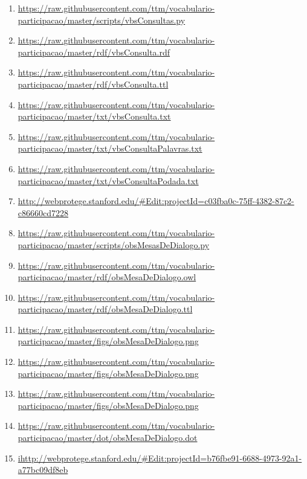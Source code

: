 \documentclass[12pt]{article}
\begin{document}
{\begin{enumerate}
\item \url{https://raw.githubusercontent.com/ttm/vocabulario-participacao/master/scripts/vbsConsultas.py}        \label{i:51}
    \item \url{https://raw.githubusercontent.com/ttm/vocabulario-participacao/master/rdf/vbsConsulta.rdf}        \label{i:52}
    \item \url{https://raw.githubusercontent.com/ttm/vocabulario-participacao/master/rdf/vbsConsulta.ttl}        \label{i:53}
    \item \url{https://raw.githubusercontent.com/ttm/vocabulario-participacao/master/txt/vbsConsulta.txt}        \label{i:54}
    \item \url{https://raw.githubusercontent.com/ttm/vocabulario-participacao/master/txt/vbsConsultaPalavras.txt}\label{i:55}
    \item \url{https://raw.githubusercontent.com/ttm/vocabulario-participacao/master/txt/vbsConsultaPodada.txt}  \label{i:56}
    \item \url{http://webprotege.stanford.edu/#Edit:projectId=c03fba0c-75ff-4382-87c2-c86660cd7228}  \label{i:56wp}

 \item \url{https://raw.githubusercontent.com/ttm/vocabulario-participacao/master/scripts/obsMesasDeDialogo.py}\label{i:57}
    \item  \url{https://raw.githubusercontent.com/ttm/vocabulario-participacao/master/rdf/obsMesaDeDialogo.owl}\label{i:58}
    \item  \url{https://raw.githubusercontent.com/ttm/vocabulario-participacao/master/rdf/obsMesaDeDialogo.ttl}\label{i:59}
    \item \url{https://raw.githubusercontent.com/ttm/vocabulario-participacao/master/figs/obsMesaDeDialogo.png}\label{i:60}
    \item \url{https://raw.githubusercontent.com/ttm/vocabulario-participacao/master/figs/obsMesaDeDialogo.png}\label{i:61}
    \item \url{https://raw.githubusercontent.com/ttm/vocabulario-participacao/master/figs/obsMesaDeDialogo.png}\label{i:62}
    \item  \url{https://raw.githubusercontent.com/ttm/vocabulario-participacao/master/dot/obsMesaDeDialogo.dot}\label{i:63}
    \item  \url{ihttp://webprotege.stanford.edu/#Edit:projectId=b76fbe91-6688-4973-92a1-a77bc09df8eb}\label{i:63wp}


\end{enumerate}}
\end{document}
